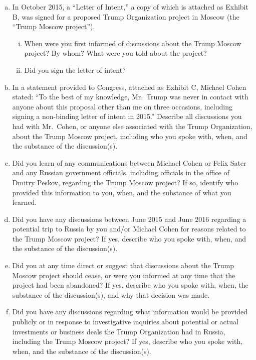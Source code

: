 \begin{enumerate}[a.]

\item In October 2015, a ``Letter of Intent,'' a copy of which is attached as Exhibit B, was signed for a proposed Trump Organization project in Moscow (the ``Trump Moscow project'').

\begin{enumerate}[i.]

\item When were you first informed of discussions about the Trump Moscow project?
By whom?
What were you told about the project?

\item Did you sign the letter of intent?

\end{enumerate}

\item In a statement provided to Congress, attached as Exhibit C, Michael Cohen stated: ``To the best of my knowledge, Mr.~Trump was never in contact with anyone about this proposal other than me on three occasions, including signing a non-binding letter of intent in 2015.''
Describe all discussions you had with Mr.~Cohen, or anyone else associated with the Trump Organization, about the Trump Moscow project, including who you spoke with, when, and the substance of the discussion(s).

\item Did you learn of any communications between Michael Cohen or Felix Sater and any Russian government officials, including officials in the office of Dmitry Peskov, regarding the Trump Moscow project?
If so, identify who provided this information to you, when, and the substance of what you learned.

\item Did you have any discussions between June 2015 and June 2016 regarding a potential trip to Russia by you and/or Michael Cohen for reasons related to the Trump Moscow project?
If yes, describe who you spoke with, when, and the substance of the discussion(s).

\item Did you at any time direct or suggest that discussions about the Trump Moscow project should cease, or were you informed at any time that the project had been abandoned?
If yes, describe who you spoke with, when, the substance of the discussion(s), and why that decision was made.

\item Did you have any discussions regarding what information would be provided publicly or in response to investigative inquiries about potential or actual investments or business deals the Trump Organization had in Russia, including the Trump Moscow project?
If yes, describe who you spoke with, when, and the substance of the discussion(s).


\end{enumerate}
